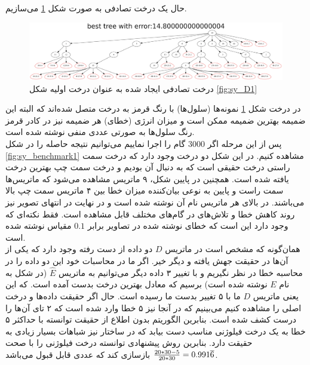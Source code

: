 حال یک درخت تصادفی به صورت شکل \ref{fig:sy_initial_T1} می‌سازیم.
\begin{figure}[!ht]
	\centering
	\includegraphics[width=\textwidth]{img/res/initial_T1}
	\caption{‌درخت تصادفی ایجاد شده به عنوان درخت اولیه شکل \ref*{fig:sy_D1}}
	\label{fig:sy_initial_T1}
\end{figure}
در درخت شکل  \ref{fig:sy_initial_T1} نمونه‌ها (سلول‌ها) با رنگ قرمز به درخت متصل شده‌اند که البته این ضمیمه بهترین ضمیمه ممکن است و میزان انرژی (خطای) هر ضمیمه نیز در کادر قرمز رنگ سلول‌ها به صورتی عددی منفی نوشته شده است. 
\\
پس از این مرحله اگر $3000$ گام  را اجرا نماییم می‌توانیم نتیجه حاصله را در شکل \ref{fig:sy_benchmark1} مشاهده کنیم. در این شکل دو درخت وجود دارد که درخت سمت راستی درخت حقیقی است که به دنبال آن بودیم و درخت سمت چپ بهترین درخت یافته شده است. همچنین در پایین شکل، ۹ ماتریس مشاهده می‌شود که ماتریس‌ها سمت راست و پایین به نوعی بیان‌کننده میزان خطا بین ۴ ماتریس سمت چپ بالا می‌باشند. در بالای هر ماتریس نام آن نوشته شده است و در نهایت در انتهای تصویر نیز روند کاهش خطا و تلاش‌های  در گام‌های مختلف قابل مشاهده است. فقط نکته‌ای که وجود دارد این است که خطای نوشته شده در تصاویر برابر $0.1$ مقیاس نوشته شده است.
\\
همان‌گونه که مشخص است در ماتریس $D$ دو داده از دست رفته وجود دارد که یکی از آن‌ها در حقیقت جهش یافته و دیگر خیر. اگر ما در محاسبات خود این دو داده را در محاسبه خطا در نظر نگیریم و با تغییر ۳ داده دیگر می‌توانیم به ماتریس $\hat{E}$ (در شکل به نام $E$ نوشته شده است) برسیم که معادل بهترین درخت بدست آمده است. که این یعنی ماتریس $D$ ما با ۵ تغییر بدست ما رسیده است. حال اگر حقیقت داده‌ها و درخت اصلی را مشاهده کنیم می‌بینیم که در آنجا نیز ۵ خطا وارد شده است که ۲ تای آن‌ها را درست کشف شده است. بنابرین الگوریتم بدون اطلاع از حقیقت توانسته با حداکثر ۵ خطا به یک درخت فیلوژنی مناسب دست بیابد که در ساختار نیز شباهات بسیار زیادی به حقیقت دارد. بنابرین روش پیشنهادی توانسته درخت فیلوژنی را با صحت 
${20*30 - 5\over 20*30} = 0.991\overline{6}$
بازسازی کند که عددی قابل قبول می‌باشد.


